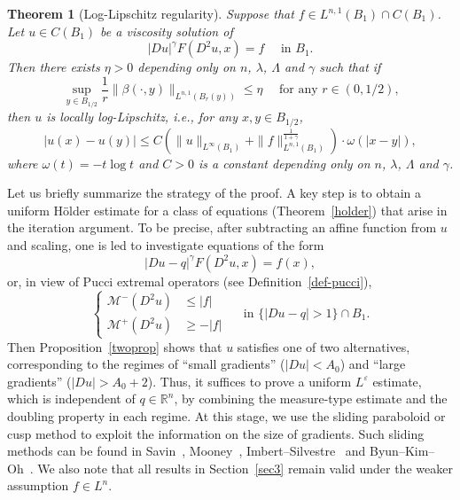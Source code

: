 \documentclass[11pt]{amsart}
\theoremstyle{plain}
\newtheorem{theorem}{Theorem}[section]
\theoremstyle{definition}
\numberwithin{equation}{section}
\begin{document}
\begin{theorem}[Log-Lipschitz regularity]\label{thm-main-p=n}
Suppose that $f \in L^{n, 1}(B_1) \cap C(B_1)$. Let $u \in C(B_1)$ be a viscosity solution of 
    \begin{equation*}
        |Du|^\gamma F(D^2u,x) =f \quad \text{ in }B_1.
    \end{equation*}
    Then there exists $\eta>0$ depending only on $n$, $\lambda$, $\Lambda$ and $\gamma$ such that if
    \begin{equation*}
         \sup_{y \in B_{1/2}} \frac{1}{r}\|\beta(\cdot, y)\|_{L^{n,1}(B_{r}(y))}  \leq \eta \quad \text{ for any $r \in (0, 1/2)$,}
    \end{equation*}
    then $u$ is locally log-Lipschitz, i.e., for any $x,y \in B_{1/2}$,
    \begin{equation*}
        |u(x)-u(y)| \leq C(\|u\|_{L^\infty(B_1)}+\|f\|_{L^{n,1}(B_1)}^{\frac{1}{1+\gamma}})\cdot \omega(|x-y|),
    \end{equation*}
    where $\omega(t) = -t\log t$ and $C>0$ is a constant depending only on $n$, $\lambda$, $\Lambda$ and $\gamma$.
\end{theorem}

Let us briefly summarize the strategy of the proof. A key step is to obtain a uniform H\"older estimate for a class of equations (Theorem~\ref{holder}) that arise in the iteration argument. To be precise, after subtracting an affine function from $u$ and scaling, one is led to investigate equations of the form 
\begin{equation*}
    |Du-q|^{\gamma}F(D^2u, x)=f(x),
\end{equation*}
or, in view of Pucci extremal operators (see Definition~\ref{def-pucci}),
\begin{equation*}
     \left\{
             \begin{aligned}
                 \mathcal{M}^-(D^2u) &\leq |f|\\
                  \mathcal{M}^+(D^2u) &\geq -|f| 
             \end{aligned}
             \right.
             \quad \text{ in } \{|Du-q|>1\} \cap B_1.
\end{equation*}
Then Proposition~\ref{twoprop} shows that $u$ satisfies one of two alternatives, corresponding to the regimes of ``small gradients'' ($|Du|<A_0$) and ``large gradients'' ($|Du|>A_0+2$). Thus, it suffices to prove a uniform $L^{\varepsilon}$ estimate, which is independent of $q \in \mathbb{R}^n$, by combining the measure-type estimate and the doubling property in each regime. At this stage, we use the sliding paraboloid or cusp method to exploit the information on the size of gradients. Such sliding methods can be found in Savin~\cite{Sav07}, Mooney~\cite{Moo15, Moo19}, Imbert--Silvestre~\cite{IS16} and Byun--Kim--Oh~\cite{BKO252}. We also note that all results in Section~\ref{sec3} remain valid under the weaker assumption $f \in L^n$.
\end{document}
